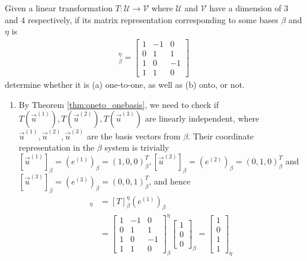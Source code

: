 \begin{exmp}
Given a linear transformation $T: \mathcal{U} \to \mathcal{V}$ where $\mathcal{U}$ and $\mathcal{V}$ have a dimension of $3$ and $4$ respectively, if its matrix representation corresponding to some bases $\mathcal{\beta}$ and $\mathcal{\eta}$ is
\begin{align*}
[T]_\beta^\eta =
\begin{bmatrix}
1 & -1 & 0 \\
0 & 1 & 1 \\
1 & 0 & -1 \\
1 & 1 & 0
\end{bmatrix}
\end{align*}
determine whether it is (a) one-to-one, as well as (b) onto, or not.
\end{exmp}
\begin{solution}
\begin{enumerate}[label=(\alph*)]
    \item By Theorem \ref{thm:oneto_onebasis}, we need to check if $T(\vec{u}^{(1)}), T(\vec{u}^{(2)}), T(\vec{u}^{(3)})$ are linearly independent, where $\vec{u}^{(1)}, \vec{u}^{(2)}, \vec{u}^{(3)}$ are the basis vectors from $\mathcal{\beta}$. Their coordinate representation in the $\mathcal{\beta}$ system is trivially $[\vec{u}^{(1)}]_\beta = (e^{(1)})_\beta = (1,0,0)_\beta^T, [\vec{u}^{(2)}]_\beta = (e^{(2)})_\beta = (0,1,0)_\beta^T$ and $[\vec{u}^{(3)}]_\beta = (e^{(3)})_\beta = (0,0,1)_\beta^T$, and hence
    \begin{align*}
    [T(\vec{u}^{(1)})]_\eta &= [T]_\beta^\eta(e^{(1)})_\beta \\
    &= 
    \begin{bmatrix}
    1 & -1 & 0 \\
    0 & 1 & 1 \\
    1 & 0 & -1 \\
    1 & 1 & 0
    \end{bmatrix}_\beta^\eta
    \begin{bmatrix}
    1 \\
    0 \\
    0
    \end{bmatrix}_\beta = 
    \begin{bmatrix}
    1 \\
    0 \\
    1 \\
    1
    \end{bmatrix}_\eta
    \end{align*}

\end{enumerate}
\end{solution}
